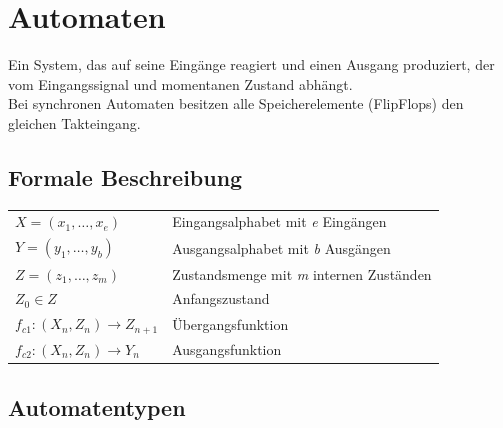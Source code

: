 \section{Automaten}
Ein System, das auf seine Eingänge reagiert und einen Ausgang produziert, der vom Eingangssignal und momentanen Zustand abhängt.\\
Bei synchronen Automaten besitzen alle Speicherelemente (FlipFlops) den gleichen Takteingang.

\subsection{Formale Beschreibung}
\begin{flushleft}
    \small
    \begin{tabular}{l p{33.5mm}}
        $X = (x_1, \dots, x_e)$ & Eingangsalphabet mit \emph{e} Eingängen\\
        $Y = (y_1, \dots, y_b)$ & Ausgangsalphabet mit \emph{b} Ausgängen\\
        $Z = (z_1, \dots, z_m)$ & Zustandsmenge mit \emph{m} internen Zuständen\\
        $Z_0 \in Z$ & Anfangszustand\\
        $f_{c1}:(X_n, Z_n) \rightarrow Z_{n+1}$ & Übergangsfunktion\\
        $f_{c2}:(X_n, Z_n) \rightarrow Y_n$ & Ausgangsfunktion
    \end{tabular}
\end{flushleft}
\subsection{Automatentypen}

